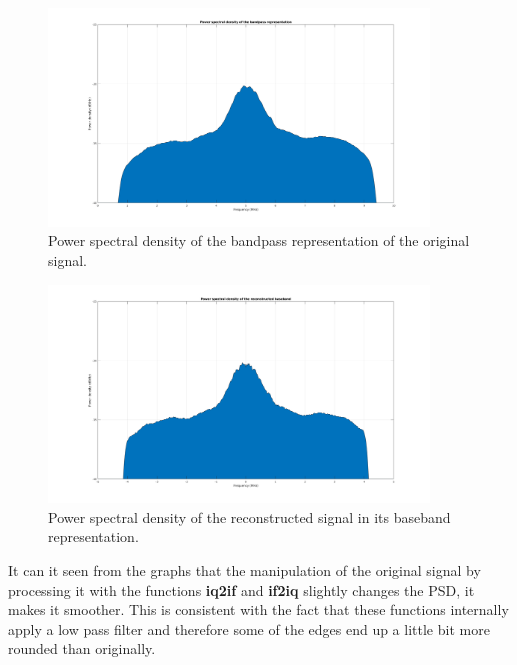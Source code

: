 \begin{figure}[H]
	\centering
	\includegraphics[width=0.9\textwidth]{figs/PSD_bandpass.png}
	\caption{Power spectral density of the bandpass representation of the original
		signal.}
	\label{fig:ex5_bandpass}
\end{figure}

\begin{figure}[H]
	\centering
	\includegraphics[width=0.9\textwidth]{figs/PSD_baseband_reconstructed.png}
	\caption{Power spectral density of the reconstructed signal in its baseband
		representation.}
	\label{fig:ex5_baseband_reconstructed}
\end{figure}

It can it seen from the graphs that the manipulation of the original signal
by processing it with the functions \textbf{iq2if} and \textbf{if2iq} slightly
changes the PSD, it makes it smoother. This is consistent with the fact that
these functions internally apply a low pass filter and therefore some of the
edges end up a little bit more rounded than originally.
